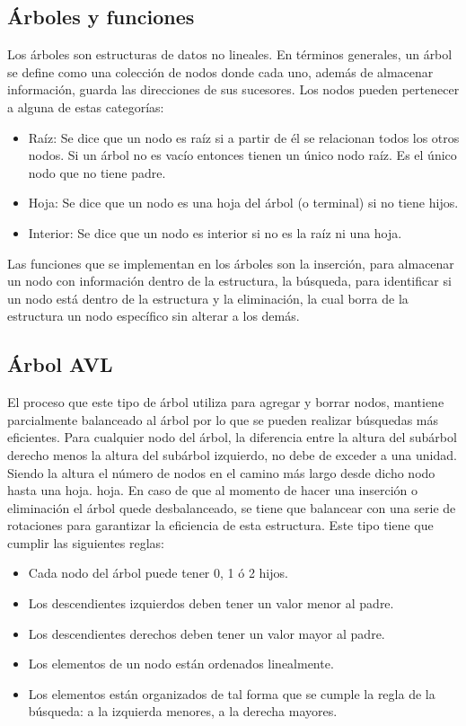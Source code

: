 \documentclass[acmsmall]{acmart}
\begin{document}
\subsection{Árboles y funciones}
Los árboles son estructuras de datos no lineales. En términos generales, un árbol se define como una colección de nodos donde cada uno, además de almacenar información, guarda las direcciones de sus sucesores. Los nodos pueden pertenecer a alguna de estas categorías:
\begin{itemize}
    \item Raíz: Se dice que un nodo es raíz si a partir de él se relacionan todos los otros nodos. Si un árbol
    no es vacío entonces tienen un único nodo raíz. Es el único nodo que no tiene padre.
    
    \item Hoja: Se dice que un nodo es una hoja del árbol (o terminal) si no tiene hijos.
    
    \item Interior: Se dice que un nodo es interior si no es la raíz ni una hoja.
\end{itemize}

Las funciones que se implementan en los árboles son la inserción, para almacenar un nodo con información dentro de la estructura, la búsqueda, para identificar si un nodo está dentro de la estructura y la eliminación, la cual borra de la estructura un nodo específico sin alterar a los demás.

\subsection{Árbol AVL}
El proceso que este tipo de árbol utiliza para agregar y borrar nodos, mantiene parcialmente balanceado al árbol por lo que se pueden realizar búsquedas más
eficientes. Para cualquier nodo del árbol, la diferencia entre la altura del subárbol derecho menos la altura del subárbol izquierdo, no debe de exceder a una unidad. Siendo la altura el número de nodos en el camino más largo desde dicho nodo hasta una hoja.
hoja. En caso de que al momento de hacer una inserción o eliminación el árbol quede desbalanceado, se tiene que balancear con una serie de rotaciones para garantizar la eficiencia de esta estructura. Este tipo tiene que cumplir las siguientes reglas:
\begin{itemize}
    \item Cada nodo del árbol puede tener 0, 1 ó 2 hijos.
    \item Los descendientes izquierdos deben tener un valor
    menor al padre.
    \item Los descendientes derechos deben tener un valor
    mayor al padre.
    \item Los elementos de un nodo están ordenados
    linealmente.
    \item Los elementos están organizados de tal forma
    que se cumple la regla de la búsqueda: a la
    izquierda menores, a la derecha mayores.
\end{itemize}{}
\end{document}
